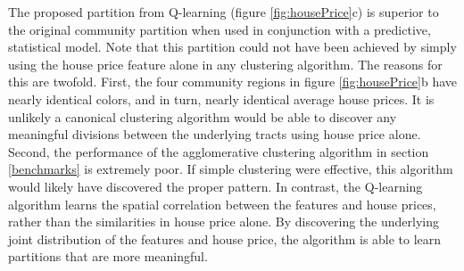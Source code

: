 The proposed partition from Q-learning (figure \ref{fig:housePrice}c) is superior to the original community partition when used in conjunction with a predictive, statistical model. Note that this partition could not have been achieved by simply using the house price feature alone in any clustering algorithm. The reasons for this are twofold. First, the four community regions in figure \ref{fig:housePrice}b have nearly identical colors, and in turn, nearly identical average house prices. It is unlikely a canonical clustering algorithm would be able to discover any meaningful divisions between the underlying tracts using house price alone. Second, the performance of the agglomerative clustering algorithm in section \ref{benchmarks} is extremely poor. If simple clustering were effective, this algorithm would likely have discovered the proper pattern. In contrast, the Q-learning algorithm learns the spatial correlation between the features and house prices, rather than the similarities in house price alone. By discovering the underlying joint distribution of the features and house price, the algorithm is able to learn partitions that are more meaningful. 





